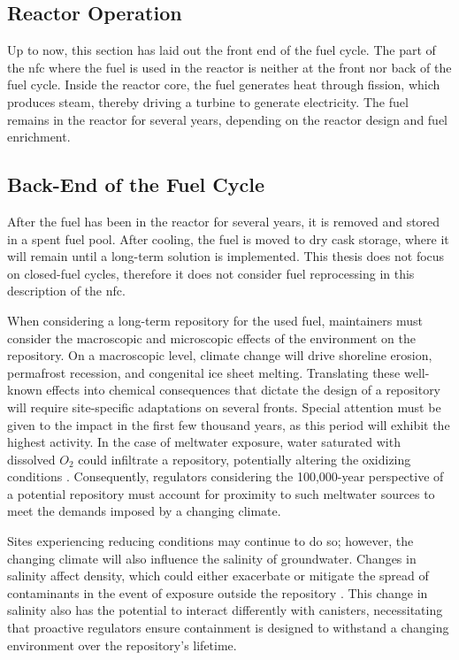 \subsection{Reactor Operation}
\label{sec:reactor_operation}
Up to now, this section has laid out the front end of the fuel cycle. The part of the \gls{nfc} where the fuel is used in the reactor is neither at the front nor back of the fuel cycle. Inside the reactor core, the fuel generates heat through fission, which produces steam, thereby driving a turbine to generate electricity. The fuel remains in the reactor for several years, depending on the reactor design and fuel enrichment. %


\subsection{Back-End of the Fuel Cycle}
\label{sec:back_end}
After the fuel has been in the reactor for several years, it is removed and
stored in a spent fuel pool. After cooling, the fuel is moved to dry cask
storage, where it will remain until a long-term solution is implemented.
This thesis does not focus on closed-fuel cycles, therefore it does not consider fuel reprocessing in this description of the \gls{nfc}.

When considering a long-term repository for the used fuel, maintainers must consider the macroscopic and microscopic effects of the environment on the repository. On a macroscopic level, climate change will drive shoreline erosion, permafrost recession, and congenital ice sheet melting. Translating these well-known effects into chemical consequences that dictate the design of a repository will require site-specific adaptations on several fronts. Special attention must be given to the impact in the first few thousand years, as this period will exhibit the highest activity. In the case of meltwater exposure, water saturated with dissolved $O_2$ could infiltrate a repository, potentially altering the oxidizing conditions \cite{gurban_hydrochemical_2001}. Consequently, regulators considering the 100,000-year perspective of a potential repository must account for proximity to such meltwater sources to meet the demands imposed by a changing climate.

Sites experiencing reducing conditions may continue to do so; however, the changing climate will also influence the salinity of groundwater. Changes in salinity affect density, which could either exacerbate or mitigate the spread of contaminants in the event of exposure outside the repository \cite{gurban_hydrochemical_2001}. This change in salinity also has the potential to interact differently with canisters, necessitating that proactive regulators ensure containment is designed to withstand a changing environment over the repository's lifetime.

